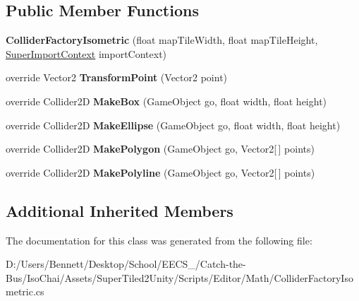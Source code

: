 \subsection*{Public Member Functions}
\begin{DoxyCompactItemize}
\item 
\mbox{\label{class_super_tiled2_unity_1_1_editor_1_1_collider_factory_isometric_a8d7243891603e03274eda4d6b77f84a7}} 
{\bfseries Collider\+Factory\+Isometric} (float map\+Tile\+Width, float map\+Tile\+Height, \mbox{\hyperlink{class_super_tiled2_unity_1_1_editor_1_1_super_import_context}{Super\+Import\+Context}} import\+Context)
\item 
\mbox{\label{class_super_tiled2_unity_1_1_editor_1_1_collider_factory_isometric_a1221124e88900f64bf6fc719280ca270}} 
override Vector2 {\bfseries Transform\+Point} (Vector2 point)
\item 
\mbox{\label{class_super_tiled2_unity_1_1_editor_1_1_collider_factory_isometric_a6ffedd088925f3021b9e15c4bb49fbd8}} 
override Collider2D {\bfseries Make\+Box} (Game\+Object go, float width, float height)
\item 
\mbox{\label{class_super_tiled2_unity_1_1_editor_1_1_collider_factory_isometric_a7b84bf423f1d4611db33d39a8bce22c8}} 
override Collider2D {\bfseries Make\+Ellipse} (Game\+Object go, float width, float height)
\item 
\mbox{\label{class_super_tiled2_unity_1_1_editor_1_1_collider_factory_isometric_a0be617501c60032468104cfce27b8522}} 
override Collider2D {\bfseries Make\+Polygon} (Game\+Object go, Vector2\mbox{[}$\,$\mbox{]} points)
\item 
\mbox{\label{class_super_tiled2_unity_1_1_editor_1_1_collider_factory_isometric_a2ed36236c1052b93e5180cb04007b8a2}} 
override Collider2D {\bfseries Make\+Polyline} (Game\+Object go, Vector2\mbox{[}$\,$\mbox{]} points)
\end{DoxyCompactItemize}
\subsection*{Additional Inherited Members}


The documentation for this class was generated from the following file\+:\begin{DoxyCompactItemize}
\item 
D\+:/\+Users/\+Bennett/\+Desktop/\+School/\+E\+E\+C\+S\+\_/\+Catch-\/the-\/\+Bus/\+Iso\+Chai/\+Assets/\+Super\+Tiled2\+Unity/\+Scripts/\+Editor/\+Math/Collider\+Factory\+Isometric.\+cs\end{DoxyCompactItemize}
